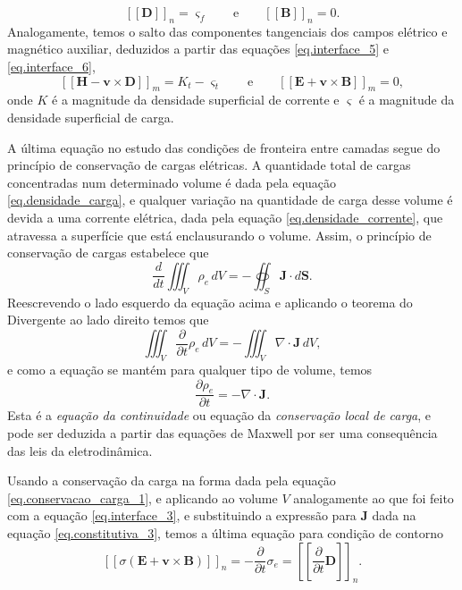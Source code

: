 \begin{equation}
\left[\left[\mathbf{D}\right]\right]_n=\varsigma_f\qquad\text{e}\qquad\left[\left[\mathbf{B}\right]\right]_n=0.
\end{equation}  
Analogamente, temos o salto das componentes tangenciais dos campos el\'etrico e magn\'etico auxiliar, deduzidos a partir das equa\c{c}\~oes \ref{eq.interface_5} e \ref{eq.interface_6},
\begin{equation}
\left[\left[\mathbf{H}-\mathbf{v}\times\mathbf{D}\right]\right]_m=K_t-\varsigma_t\qquad\text{e}\qquad\left[\left[\mathbf{E}+\mathbf{v}\times\mathbf{B}\right]\right]_m=0,
\end{equation}
onde $K$ \'e a magnitude da densidade superficial de corrente e $\varsigma$ \'e a magnitude da densidade superficial de carga.

A \'ultima equa\c{c}\~ao no estudo das condi\c{c}\~oes de fronteira entre camadas segue do princ\'ipio de conserva\c{c}\~ao de cargas el\'etricas. A quantidade total de cargas concentradas num determinado volume \'e dada pela equa\c{c}\~ao \ref{eq.densidade_carga}, e qualquer varia\c{c}\~ao na quantidade de carga desse volume \'e devida a uma corrente el\'etrica, dada pela equa\c{c}\~ao \ref{eq.densidade_corrente}, que atravessa a superf\'icie que est\'a enclausurando o volume. Assim,  o princ\'ipio de conserva\c{c}\~ao de cargas estabelece que
\begin{equation}\label{eq.conservacao_carga_1}
\frac{d}{dt}\iiint_V\rho_e\,dV=-\oiint_S\mathbf{J}\cdot d\mathbf{S}.
\end{equation}
Reescrevendo o lado esquerdo da equa\c{c}\~ao acima e aplicando o teorema do Divergente ao lado direito temos que
\begin{equation*}
\iiint_V\frac{\partial}{\partial t}\rho_e\,dV=-\iiint_V\nabla\cdot\mathbf{J}\,dV,
\end{equation*}
e como a equa\c{c}\~ao se mant\'em para qualquer tipo de volume, temos
\begin{equation*}
\frac{\partial\rho_e}{\partial t}=-\nabla\cdot\mathbf{J}.
\end{equation*}
Esta \'e a \textit{equa\c{c}\~ao da continuidade} ou equa\c{c}\~ao da \textit{conserva\c{c}\~ao local de carga}, e pode ser deduzida a partir das equa\c{c}\~oes de Maxwell por ser uma consequ\^encia das leis da eletrodin\^amica. 

Usando a conserva\c{c}\~ao da carga na forma dada pela equa\c{c}\~ao \ref{eq.conservacao_carga_1}, e aplicando ao volume $V$ analogamente ao que foi feito com a equa\c{c}\~ao \ref{eq.interface_3}, e substituindo a express\~ao para $\mathbf{J}$ dada na equa\c{c}\~ao \ref{eq.constitutiva_3}, temos a \'ultima equa\c{c}\~ao para condi\c{c}\~ao de contorno
\begin{equation*}
\left[\left[\sigma(\mathbf{E}+\mathbf{v}\times\mathbf{B})\right]\right]_n=-\frac{\partial}{\partial t}\sigma_e=\left[\left[\frac{\partial}{\partial t}\mathbf{D}\right]\right]_n.
\end{equation*}

